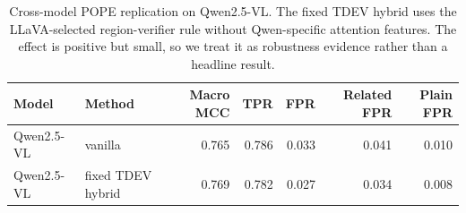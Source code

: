 \begin{table}[t]
\centering
\small
\setlength{\tabcolsep}{4.0pt}
\begin{tabular}{llrrrrr}
\toprule
Model & Method & Macro MCC & TPR & FPR & Related FPR & Plain FPR \\
\midrule
Qwen2.5-VL & vanilla & 0.765 & 0.786 & 0.033 & 0.041 & 0.010 \\
Qwen2.5-VL & fixed TDEV hybrid & 0.769 & 0.782 & 0.027 & 0.034 & 0.008 \\
\bottomrule
\end{tabular}
\caption{Cross-model POPE replication on Qwen2.5-VL. The fixed TDEV hybrid uses the LLaVA-selected region-verifier rule without Qwen-specific attention features. The effect is positive but small, so we treat it as robustness evidence rather than a headline result.}
\label{tab:appendix-qwen}
\end{table}
